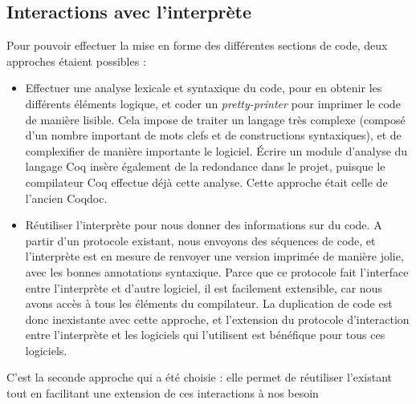 \documentclass[a4paper, 11pt]{report}
\begin{document}
    \subsection{Interactions avec l'interprète}
    Pour pouvoir effectuer la mise en forme des différentes sections de code,
    deux approches étaient possibles :
      \begin{itemize}
        \item Effectuer une analyse lexicale et syntaxique du code, pour
          en obtenir les différents éléments logique, et coder un
          \textit{pretty-printer} pour imprimer le code de manière lisible.
          Cela impose de traiter un langage très complexe (composé d'un nombre
          important de mots clefs et de constructions syntaxiques), et de
          complexifier de manière importante le logiciel. Écrire un module
          d'analyse du langage Coq insère également de la redondance dans le
          projet, puisque le compilateur Coq effectue déjà cette analyse. Cette
          approche était celle de l'ancien Coqdoc.
        \item Réutiliser l'interprète pour nous donner des informations sur
          du code. A partir d'un protocole existant, nous envoyons des séquences
          de code, et l'interprète est en mesure de renvoyer une version imprimée
          de manière jolie, avec les bonnes annotations syntaxique.
          Parce que ce protocole fait l'interface entre l'interprète et d'autre
          logiciel, il est facilement extensible, car nous avons accès à tous
          les éléments du compilateur. La duplication de code est donc inexistante
          avec cette approche, et l'extension du protocole d'interaction entre
          l'interprète et les logiciels qui l'utilisent est bénéfique pour tous
          ces logiciels.
      \end{itemize}
    C'est la seconde approche qui a été choisie : elle permet de réutiliser
    l'existant tout en facilitant une extension de ces interactions à nos besoin
\end{document}
